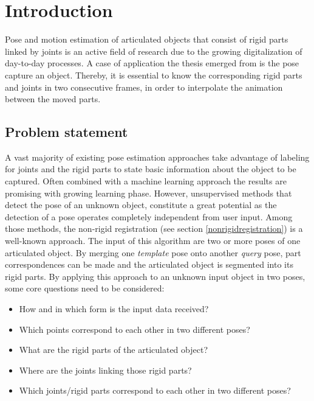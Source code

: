 \chapter{Introduction}
\label{cha:Introduction}

Pose and motion estimation of articulated objects that consist of rigid parts linked by joints is an active field of research due to the growing digitalization of day-to-day processes. A case of application the thesis emerged from is the pose capture an object. Thereby, it is essential to know the corresponding rigid parts and joints in two consecutive frames, in order to interpolate the animation between the moved parts.

\section{Problem statement}
A vast majority of existing pose estimation approaches take advantage of labeling for joints and the rigid parts to state basic information about the object to be captured. Often combined with a machine learning approach the results are promising with growing learning phase. However, unsupervised methods that detect the pose of an unknown object, constitute a great potential as the detection of a pose operates completely independent from user input. Among those methods, the non-rigid registration (see section \ref{nonrigidregistration}) is a well-known approach. The input of this algorithm are two or more poses of one articulated object. By merging one \textit{template} pose onto another \textit{query} pose, part correspondences can be made and the articulated object is segmented into its rigid parts. 
By applying this approach to an unknown input object in two poses, some core questions need to be considered:
\\\begin{itemize}
	\item How and in which form is the input data received?
	\item Which points correspond to each other in two different poses?
	\item What are the rigid parts of the articulated object?
	\item Where are the joints linking those rigid parts?
	\item Which joints/rigid parts correspond to each other in two different poses?
\end{itemize}
